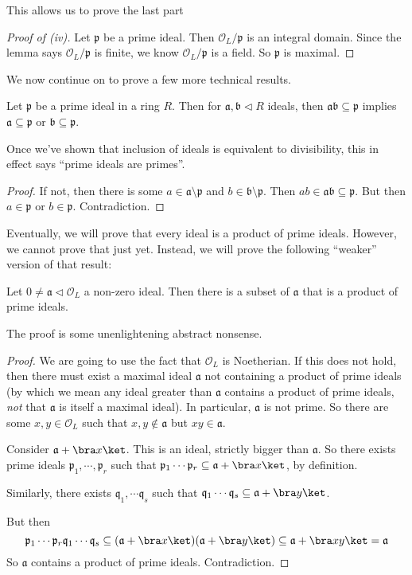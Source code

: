 \documentclass[a4paper]{article}
\begin{document}
This allows us to prove the last part
\begin{proof}[Proof of (iv)]
  Let $\mathfrak{p}$ be a prime ideal. Then $\mathcal{O}_L/\mathfrak{p}$ is an integral domain. Since the lemma says $\mathcal{O}_L/\mathfrak{p}$ is finite, we know $\mathcal{O}_L/\mathfrak{p}$ is a field. So $\mathfrak{p}$ is maximal.
\end{proof}

We now continue on to prove a few more technical results.
\begin{lemma}
  Let $\mathfrak{p}$ be a prime ideal in a ring $R$. Then for $\mathfrak{a}, \mathfrak{b}\lhd R$ ideals, then $\mathfrak{a}\mathfrak{b} \subseteq \mathfrak{p}$ implies $\mathfrak{a} \subseteq \mathfrak{p}$ or $\mathfrak{b}\subseteq \mathfrak{p}$.
\end{lemma}
Once we've shown that inclusion of ideals is equivalent to divisibility, this in effect says ``prime ideals are primes''.

\begin{proof}
  If not, then there is some $a \in \mathfrak{a}\setminus \mathfrak{p}$ and $b \in \mathfrak{b}\setminus \mathfrak{p}$. Then $ab \in \mathfrak{a}\mathfrak{b} \subseteq \mathfrak{p}$. But then $a \in \mathfrak{p}$ or $b \in \mathfrak{p}$. Contradiction.
\end{proof}

Eventually, we will prove that every ideal is a product of prime ideals. However, we cannot prove that just yet. Instead, we will prove the following ``weaker'' version of that result:
\begin{lemma}
  Let $0 \not= \mathfrak{a} \lhd \mathcal{O}_L$ a non-zero ideal. Then there is a subset of $\mathfrak{a}$ that is a product of prime ideals.
\end{lemma}

The proof is some unenlightening abstract nonsense.
\begin{proof}
  We are going to use the fact that $\mathcal{O}_L$ is Noetherian. If this does not hold, then there must exist a maximal ideal $\mathfrak{a}$ not containing a product of prime ideals (by which we mean any ideal greater than $\mathfrak{a}$ contains a product of prime ideals, \emph{not} that $\mathfrak{a}$ is itself a maximal ideal). In particular, $\mathfrak{a}$ is not prime. So there are some $x,y \in \mathcal{O}_L$ such that $x, y \not\in \mathfrak{a}$ but $xy \in \mathfrak{a}$.

  Consider $\mathfrak{a} + \bra x\ket$. This is an ideal, strictly bigger than $\mathfrak{a}$. So there exists prime ideals $\mathfrak{p}_1, \cdots, \mathfrak{p}_r$ such that $\mathfrak{p}_1\cdots \mathfrak{p}_r \subseteq \mathfrak{a} + \bra x\ket$, by definition.

  Similarly, there exists $\mathfrak{q}_1, \cdots\mathfrak{q}_s$ such that $\mathfrak{q}_1 \cdots \mathfrak{q}_s \subseteq \mathfrak{a} + \bra y\ket$.

  But then
  \[
    \mathfrak{p}_1\cdots\mathfrak{p}_r \mathfrak{q}_1\cdots\mathfrak{q}_s \subseteq (\mathfrak{a} + \bra x\ket)(\mathfrak{a} + \bra y\ket) \subseteq \mathfrak{a} + \bra xy\ket = \mathfrak{a}
  \]
  So $\mathfrak{a}$ contains a product of prime ideals. Contradiction.
\end{proof}
\end{document}
